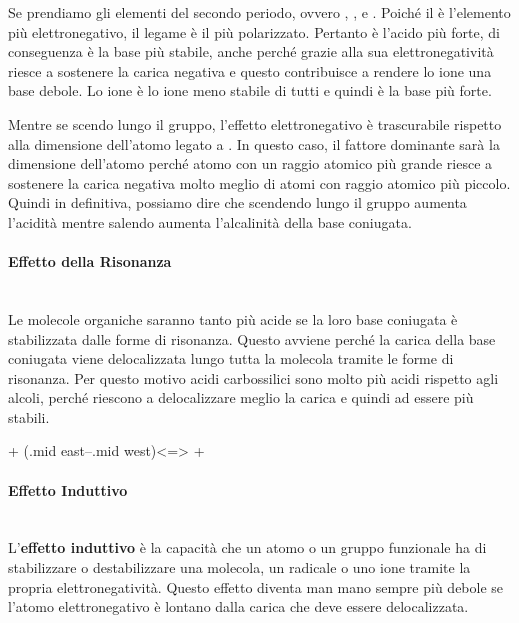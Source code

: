 Se prendiamo gli elementi del secondo periodo, ovvero , ,  e . Poiché il  è l'elemento più elettronegativo, il legame  è il più polarizzato. Pertanto  è l'acido più forte, di conseguenza  è la base più stabile, anche perché grazie alla sua elettronegatività riesce a sostenere la carica negativa e questo contribuisce a rendere lo ione  una base debole. Lo ione  è lo ione meno stabile di tutti e quindi è la base più forte.

Mentre se scendo lungo il gruppo, l'effetto elettronegativo è trascurabile rispetto alla dimensione dell'atomo legato a . In questo caso, il fattore dominante sarà la dimensione dell'atomo perché atomo con un raggio atomico più grande riesce a sostenere la carica negativa molto meglio di atomi con raggio atomico più piccolo. Quindi in definitiva, possiamo dire che scendendo lungo il gruppo aumenta l'acidità mentre salendo aumenta l'alcalinità della base coniugata.

\paragraph{Effetto della Risonanza}\mbox{}\\
Le molecole organiche saranno tanto più acide se la loro base coniugata è stabilizzata dalle forme di risonanza. Questo avviene perché la carica della base coniugata viene delocalizzata lungo tutta la molecola tramite le forme di risonanza. Per questo motivo acidi carbossilici sono molto più acidi rispetto agli alcoli, perché riescono a delocalizzare meglio la carica e quindi ad essere più stabili.

\begingroup
{}
\begin{reaction}
	 +  \arrow(.mid east--.mid west){<=>}
	 + 
\end{reaction}
\endgroup


\paragraph{Effetto Induttivo}\mbox{}\\
L'\textbf{effetto induttivo} è la capacità che un atomo o un gruppo funzionale ha di stabilizzare o destabilizzare una molecola, un radicale o uno ione tramite la propria elettronegatività. Questo effetto diventa man mano sempre più debole se l'atomo elettronegativo è lontano dalla carica che deve essere delocalizzata.


